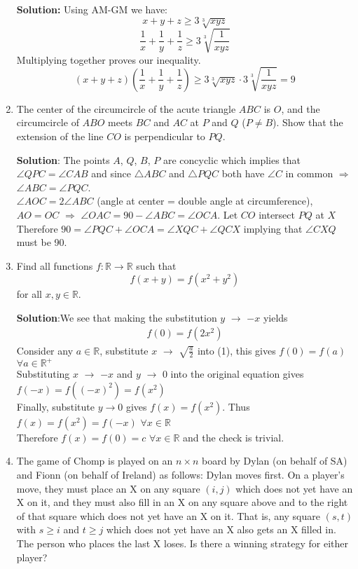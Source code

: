 \documentclass{article}
\begin{document}
\begin{enumerate}[itemsep=24pt]
\textbf{Solution:} 
Using AM-GM we have:
$$x+y+z \geq 3\sqrt[3]{xyz}$$
$$\frac{1}{x}+\frac{1}{y}+\frac{1}{z} \geq 3\sqrt[3]{\frac{1}{xyz}}$$
Multiplying together proves our inequality.
$$(x+y+z)(\frac{1}{x}+\frac{1}{y}+\frac{1}{z}) \geq 3\sqrt[3]{xyz}\cdot 3\sqrt[3]{\frac{1}{xyz}} = 9$$

\item
The center of the circumcircle of the acute triangle $ABC$ is $O$, and the circumcircle of $ABO$ meets $BC$ and $AC$ at $P$ and $Q$ ($P\neq B$).
Show that the extension of the line $CO$ is perpendicular to $PQ$.

\textbf{Solution}:
The points $A$, $Q$, $B$, $P$ are concyclic which implies that $\angle{QPC} = \angle{CAB}$ and since $\triangle{ABC}$ and $\triangle{PQC}$ both have $\angle{C}$ in common $\Rightarrow$ $\angle{ABC}=\angle{PQC}$.
\\$\angle{AOC} = 2\angle{ABC}$ (angle at center = double angle at circumference), $AO = OC$ $\Rightarrow$ $\angle{OAC} = 90 - \angle{ABC} = \angle{OCA}$. Let $CO$ intersect $PQ$ at $X$
\\Therefore $90 = \angle{PQC} + \angle{OCA} = \angle{XQC} + \angle{QCX}$ implying that $\angle{CXQ}$ must be 90.

\item
Find all functions $f : \mathbb{R} \to \mathbb{R}$ such that \[ f(x+y) = f(x^2+y^2) \] for all $x,y \in \mathbb{R}$.

\textbf{Solution}:We see that making the substitution $y$ $\rightarrow$ $-x$ yields 
\begin{align}
    f(0)=f(2x^{2})
\end{align}
Consider any $a \in \mathbb{R}$, substitute $x$ $\rightarrow$ $\sqrt{\frac{a}{2}}$ into (1), this gives $f(0) = f(a)$ $\forall a \in \mathbb{R^{+}}$
\\Substituting $x$ $\rightarrow$ $-x$ and $y$ $\rightarrow$ $0$ into the original equation gives $f(-x) = f((-x)^{2}) = f(x^{2})$
\\Finally, substitute $y \rightarrow 0$ gives $f(x) = f(x^{2})$. Thus $f(x)= f(x^{2}) = f(-x)$ $\forall x \in \mathbb{R}$
\\Therefore $f(x) = f(0) = c$ $\forall x \in \mathbb{R}$ and the check is trivial.

\item %
The game of Chomp is played on an $n \times n$ board by Dylan (on behalf of SA) and Fionn (on behalf of Ireland) as follows: Dylan moves first.
On a player's move, they must place an X on any square $(i, j)$ which does not yet have an X on it, and they must also fill in an X on any square above and to the right of that square which does not yet have an X on it.
That is, any square $(s, t)$ with $s \geq i$ and $t \geq j$ which does not yet have an X also gets an X filled in.
The person who places the last X loses.
Is there a winning strategy for either player?


\end{enumerate}
\end{document}
